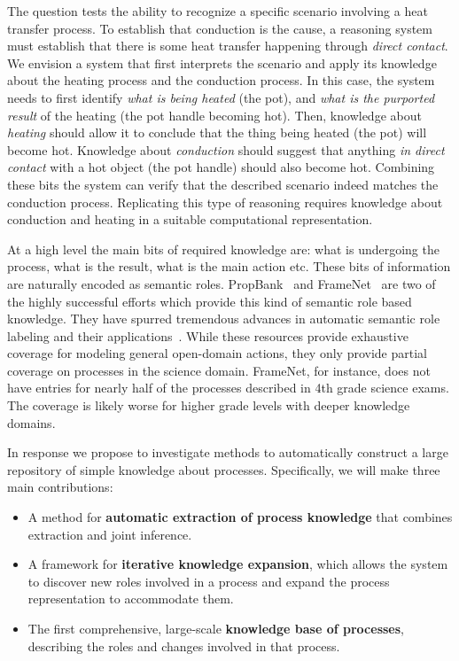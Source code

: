 The question tests the ability to recognize a specific scenario involving a heat transfer process.
To establish that conduction is the cause, a reasoning system must establish that there is some heat transfer happening through {\em direct contact}. 
We envision a system that first interprets the scenario and apply its knowledge about the heating process and the conduction process. 
In this case, the system needs to first identify {\em what is being heated} (the pot), and {\em what is the purported result} of the heating (the pot handle becoming hot). 
Then, knowledge about {\em heating} should allow it to conclude that the thing being heated (the pot) will become hot. 
Knowledge about {\em conduction} should suggest that anything {\em in direct contact} with a hot object (the pot handle) should also become hot.
Combining these bits the system can verify that the described scenario indeed matches the conduction process.
Replicating this type of reasoning requires knowledge about conduction and heating in a suitable computational representation.


At a high level the main bits of required knowledge are: what is undergoing the process, what is the result, what is the main action etc.
These bits of information are naturally encoded as semantic roles.
PropBank~\cite{kingsbury2003propbank} and FrameNet~\cite{baker1998berkeley} are two of the highly successful efforts which provide this kind of semantic role based knowledge.
They have spurred tremendous advances in automatic semantic role labeling and their applications~\cite{gildea2002automatic,surdeanu2008conll,feizabadi2015combining,roth2015context}.
While these resources provide exhaustive coverage for modeling general open-domain actions, they only provide partial coverage on processes in the science domain.
FrameNet, for instance, does not have entries for nearly half of the processes described in 4th grade science exams. 
The coverage is likely worse for higher grade levels with deeper knowledge domains. 

In response we propose to investigate methods to automatically construct a large repository of simple knowledge about processes. Specifically, we will make three main contributions:
\begin{itemize}
\item A method for {\bf automatic extraction of process knowledge} that combines extraction and joint inference.
\item A framework for {\bf iterative knowledge expansion}, which allows the system to discover new roles
     involved in a process and expand the process representation to accommodate them.
\item The first comprehensive, large-scale {\bf knowledge base of processes}, describing the roles
      and changes involved in that process.
\end{itemize}

